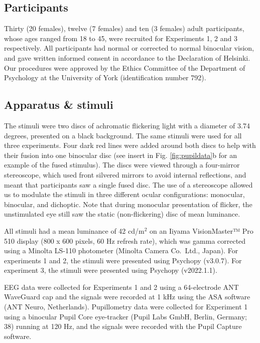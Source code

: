\documentclass[
]{article}
\begin{document}
\hypertarget{participants}{%
\subsection{Participants}\label{participants}}

Thirty (20 females), twelve (7 females) and ten (3 females) adult participants, whose ages ranged from 18 to 45, were recruited for Experiments 1, 2 and 3 respectively. All participants had normal or corrected to normal binocular vision, and gave written informed consent in accordance to the Declaration of Helsinki. Our procedures were approved by the Ethics Committee of the Department of Psychology at the University of York (identification number 792).

\hypertarget{apparatus-stimuli}{%
\subsection{Apparatus \& stimuli}\label{apparatus-stimuli}}

The stimuli were two discs of achromatic flickering light with a diameter of 3.74 degrees, presented on a black background. The same stimuli were used for all three experiments. Four dark red lines were added around both discs to help with their fusion into one binocular disc (see insert in Fig. \ref{fig:pupildata}b for an example of the fused stimulus). The discs were viewed through a four-mirror stereoscope, which used front silvered mirrors to avoid internal reflections, and meant that participants saw a single fused disc. The use of a stereoscope allowed us to modulate the stimuli in three different ocular configurations: monocular, binocular, and dichoptic. Note that during monocular presentation of flicker, the unstimulated eye still saw the static (non-flickering) disc of mean luminance.

All stimuli had a mean luminance of 42 cd/m\(^2\) on an Iiyama VisionMaster™ Pro 510 display (800 x 600 pixels, 60 Hz refresh rate), which was gamma corrected using a Minolta LS-110 photometer (Minolta Camera Co.~Ltd., Japan). For experiments 1 and 2, the stimuli were presented using Psychopy (v3.0.7). For experiment 3, the stimuli were presented using Psychopy (v2022.1.1).

EEG data were collected for Experiments 1 and 2 using a 64-electrode ANT WaveGuard cap and the signals were recorded at 1 kHz using the ASA software (ANT Neuro, Netherlands). Pupillometry data were collected for Experiment 1 using a binocular Pupil Core eye-tracker (Pupil Labs GmbH, Berlin, Germany; 38) running at 120 Hz, and the signals were recorded with the Pupil Capture software.
\end{document}
